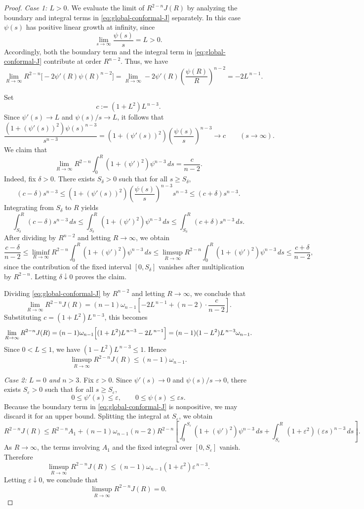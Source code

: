\documentclass[12pt,oneside,a4paper]{article}
\theoremstyle{mytheorem}
\theoremstyle{remark}
\begin{document}
\begin{proof}
\noindent\emph{Case 1: $L>0$.}
We evaluate the limit of $R^{2-n}J(R)$ by analyzing the boundary and integral
terms in \eqref{eq:global-conformal-J} separately. In this case $\psi(s)$ has positive linear growth at infinity, since
\[
\lim_{s\to\infty}\frac{\psi(s)}{s}=L>0.
\]
Accordingly, both the boundary term and the integral term in
\eqref{eq:global-conformal-J} contribute at order $R^{n-2}$.
Thus, we have
\[
\lim_{R\to\infty} R^{2-n}\bigl[-2\psi'(R)\psi(R)^{n-2}\bigr]
=
\lim_{R\to\infty}
-2\psi'(R)\left(\frac{\psi(R)}{R}\right)^{n-2}
=
-2L^{\,n-1}.
\]

Set
\[
c:=(1+L^2)L^{\,n-3}.
\]
Since $\psi'(s)\to L$ and $\psi(s)/s \to L$, it follows that
\[
\frac{(1+(\psi'(s))^2)\psi(s)^{n-3}}{s^{n-3}}
=
(1+(\psi'(s))^2)\left(\frac{\psi(s)}{s}\right)^{n-3}
\longrightarrow c
\qquad (s\to\infty).
\]
We claim that
\[
\lim_{R\to\infty}
R^{2-n}\int_0^R (1+(\psi')^2)\psi^{n-3}\,ds
=
\frac{c}{n-2}.
\]
Indeed, fix $\delta>0$. There exists $S_\delta>0$ such that for all
$s\ge S_\delta$,
\[
(c-\delta)s^{n-3}
\le
(1+(\psi'(s))^2) (\frac{\psi(s)}{s})^{n-3}s^{n-3}
\le
(c+\delta)s^{n-3}.
\]
Integrating from $S_\delta$ to $R$ yields
\[
\int_{S_\delta}^R (c-\delta)s^{n-3}\,ds
\le
\int_{S_\delta}^R (1+(\psi')^2)\psi^{n-3}\,ds
\le
\int_{S_\delta}^R (c+\delta)s^{n-3}\,ds.
\]
After dividing by \(R^{n-2}\) and letting \(R\to\infty\), we obtain
\[
\frac{c-\delta}{n-2}
\le
\liminf_{R\to\infty}
R^{2-n}\int_0^R (1+(\psi')^2)\psi^{n-3}\,ds
\le
\limsup_{R\to\infty}
R^{2-n}\int_0^R (1+(\psi')^2)\psi^{n-3}\,ds
\le
\frac{c+\delta}{n-2},
\]
since the contribution of the fixed interval \([0,S_\delta]\) vanishes after
multiplication by \(R^{2-n}\). Letting \(\delta\downarrow 0\) proves the claim.

Dividing \eqref{eq:global-conformal-J} by \(R^{n-2}\) and letting \(R\to\infty\),
we conclude that
\[
\lim_{R\to\infty} R^{2-n}J(R)
=
(n-1)\omega_{n-1}
\left[
-2L^{\,n-1}
+
(n-2)\cdot \frac{c}{n-2}
\right].
\]
Substituting \(c=(1+L^2)L^{\,n-3}\), this becomes
\[
\lim_{R\to\infty} R^{2-n}J(R)
=
(n-1)\omega_{n-1}\Bigl[(1+L^2)L^{\,n-3}-2L^{\,n-1}\Bigr]
=
(n-1)(1-L^2)L^{\,n-3}\omega_{n-1}.
\]
Since \(0<L\le 1\), we have \((1-L^2)L^{\,n-3}\le 1\). Hence
\[
\limsup_{R\to\infty}R^{2-n}J(R)\le (n-1)\omega_{n-1}.
\]

\noindent\emph{Case 2: $L=0$ and $n>3$.}
Fix $\varepsilon>0$. Since $\psi'(s)\to 0$ and $\psi(s)/s\to 0$, there exists
$S_\varepsilon>0$ such that for all $s\ge S_\varepsilon$,
\[
0\le \psi'(s)\le \varepsilon,
\qquad
0\le \psi(s)\le \varepsilon s.
\]
Because the boundary term in \eqref{eq:global-conformal-J} is nonpositive, we may
discard it for an upper bound. Splitting the integral at $S_\varepsilon$, we obtain
\[
R^{2-n}J(R)
\le
R^{2-n}A_1
+
(n-1)\omega_{n-1}(n-2)R^{2-n}
\left[
\int_0^{S_\varepsilon}(1+(\psi')^2)\psi^{n-3}\,ds
+
\int_{S_\varepsilon}^R (1+\varepsilon^2)(\varepsilon s)^{n-3}\,ds
\right].
\]
As \(R\to\infty\), the terms involving \(A_1\) and the fixed integral over
\([0,S_\varepsilon]\) vanish. Therefore
\[
\limsup_{R\to\infty}R^{2-n}J(R)
\le
(n-1)\omega_{n-1}(1+\varepsilon^2)\varepsilon^{\,n-3}.
\]
Letting \(\varepsilon\downarrow0\), we conclude that
\[
\limsup_{R\to\infty}R^{2-n}J(R)=0.
\]


\end{proof}
\end{document}
